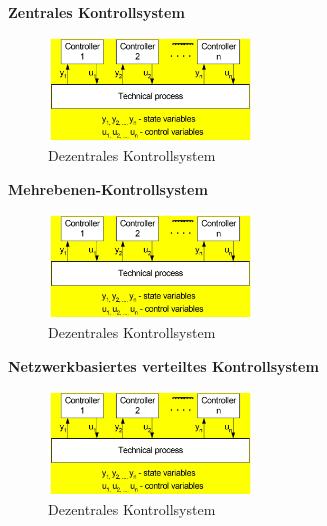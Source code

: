 \documentclass[12pt,a4paper,ngerman]{article}
\begin{document}
\textbf{Zentrales Kontrollsystem}
\\
\begin{figure}
\vspace{-20pt}
  \begin{center}
    \includegraphics[width=0.48\textwidth]{figures/dezentral.pdf}
  \end{center}
  \caption{Dezentrales Kontrollsystem}
\vspace{-10pt}
\end{figure}
\textbf{Mehrebenen-Kontrollsystem}
\\
\begin{figure}
\vspace{-20pt}
  \begin{center}
    \includegraphics[width=0.48\textwidth]{figures/dezentral.pdf}
  \end{center}
  \caption{Dezentrales Kontrollsystem}
\vspace{-10pt}
\end{figure}\textbf{Netzwerkbasiertes verteiltes Kontrollsystem}
\\
\begin{figure}
\vspace{-20pt}
  \begin{center}
    \includegraphics[width=0.48\textwidth]{figures/dezentral.pdf}
  \end{center}
  \caption{Dezentrales Kontrollsystem}
\vspace{-10pt}
\end{figure}
\end{document}
